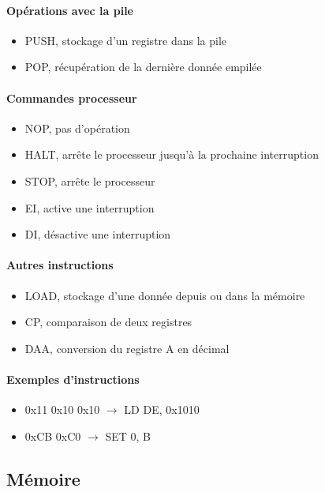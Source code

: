 \documentclass[a4paper]{article}
\begin{document}
\paragraph{Opérations avec la pile}
\begin{itemize}[label=\textbullet]
	\item PUSH, stockage d'un registre dans la pile
	\item POP, récupération de la dernière donnée empilée
\end{itemize}
\paragraph{Commandes processeur}
\begin{itemize}[label=\textbullet]
	\item NOP, pas d'opération
	\item HALT, arrête le processeur jusqu'à la prochaine interruption
	\item STOP, arrête le processeur
	\item EI, active une interruption
	\item DI, désactive une interruption
\end{itemize}
\paragraph{Autres instructions}
\begin{itemize}[label=\textbullet]
	\item LOAD, stockage d'une donnée depuis ou dans la mémoire
	\item CP, comparaison de deux registres
	\item DAA, conversion du registre A en décimal
\end{itemize}

\paragraph{Exemples d'instructions}
\begin{itemize}[label=\textbullet]
	\item 0x11 0x10 0x10 $\rightarrow$ LD DE, 0x1010
	\item 0xCB 0xC0 $\rightarrow$ SET 0, B
\end{itemize}

\newpage


\subsection{Mémoire}
\end{document}
